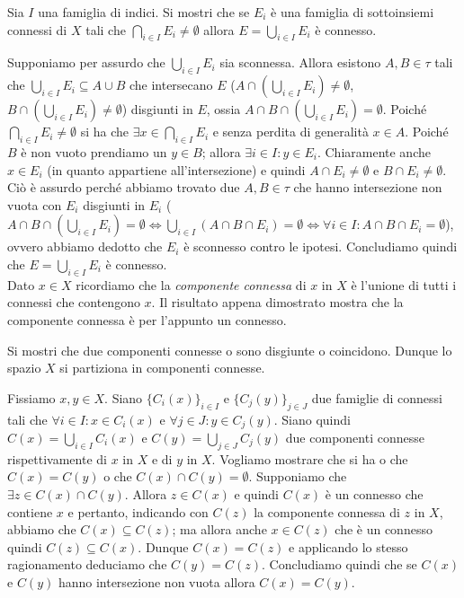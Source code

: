 \begin{es}
  Sia $ I $ una famiglia di indici. Si mostri che se $ E_i $ è una famiglia di sottoinsiemi connessi di $ X $ tali che $ \bigcap_{i \in I} E_i \neq \emptyset $ allora $ E = \bigcup_{i \in I} E_i $ è connesso.
\end{es}
%
Supponiamo per assurdo che $ \bigcup_{i \in I} E_i $ sia sconnessa. Allora esistono $ A, B \in \tau $ tali che $ \bigcup_{i \in I} E_i \subseteq A \cup B $ che intersecano $ E $ ($ A \cap \left(\bigcup_{i \in I} E_i\right) \neq \emptyset $, $ B \cap \left(\bigcup_{i \in I} E_i\right) \neq \emptyset $) disgiunti in $ E $, ossia $ A \cap B \cap \left(\bigcup_{i \in I} E_i\right) = \emptyset $. Poiché $ \bigcap_{i \in I} E_i \neq \emptyset $ si ha che $ \exists x \in \bigcap_{i \in I} E_i $ e senza perdita di generalità $ x \in A $. Poiché $ B $ è non vuoto prendiamo un $ y \in B $; allora $ \exists i \in I : y \in E_i $. Chiaramente anche $ x \in E_i $ (in quanto appartiene all'intersezione) e quindi $ A \cap E_i \neq \emptyset $ e $ B \cap E_i \neq \emptyset $. Ciò è assurdo perché abbiamo trovato due $ A, B \in \tau $ che hanno intersezione non vuota con $ E_i $ disgiunti in $ E_i $ ($ A \cap B \cap \left(\bigcup_{i \in I} E_i\right) = \emptyset  \iff \bigcup_{i \in I} (A \cap B \cap E_i) = \emptyset \iff \forall i \in I : A \cap B \cap E_i = \emptyset$), ovvero abbiamo dedotto che $ E_i $ è sconnesso contro le ipotesi. Concludiamo quindi che $ E = \bigcup_{i \in I} E_i $ è connesso. \\
Dato $ x \in X $ ricordiamo che la \emph{componente connessa} di $ x $ in $ X $ è l'unione di tutti i connessi che contengono $ x $. Il risultato appena dimostrato mostra che la componente connessa è per l'appunto un connesso.

\begin{es}
  Si mostri che due componenti connesse o sono disgiunte o coincidono. Dunque lo spazio $ X $ si partiziona in componenti connesse.
\end{es}
%
Fissiamo $ x, y \in X $. Siano $ \{C_i(x)\}_{i \in I} $ e $ \{C_j(y)\}_{j \in J} $ due famiglie di connessi tali che $ \forall i \in I : x \in C_i(x) $ e $ \forall j \in J : y \in C_j(y) $. Siano quindi $ C(x) = \bigcup_{i \in I} C_i(x) $ e $ C(y) = \bigcup_{j \in J} C_j(y) $ due componenti connesse rispettivamente di $ x $ in $ X $ e di $ y $ in $ X $. Vogliamo mostrare che si ha o che $ C(x) = C(y) $ o che $ C(x) \cap C(y) = \emptyset $. Supponiamo che $ \exists z \in C(x) \cap C(y) $. Allora $ z \in C(x) $ e quindi $ C(x) $ è un connesso che contiene $ x $ e pertanto, indicando con $ C(z) $ la componente connessa di $ z $ in $ X $, abbiamo che $ C(x) \subseteq C(z) $; ma allora anche $ x \in C(z) $ che è un connesso quindi $ C(z) \subseteq C(x) $. Dunque $ C(x) = C(z) $ e applicando lo stesso ragionamento deduciamo che $ C(y) = C(z) $. Concludiamo quindi che se $ C(x) $ e $ C(y) $ hanno intersezione non vuota allora $ C(x) = C(y) $.

